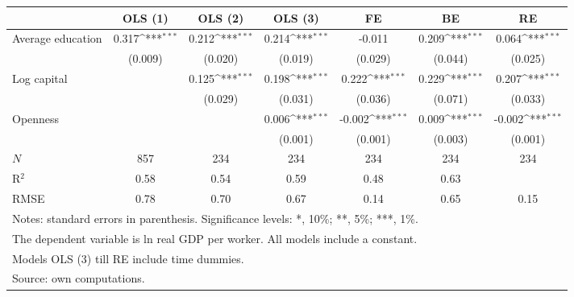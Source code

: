 {
\def\sym#1{\ifmmode^{#1}\else\(^{#1}\)\fi}
\begin{tabular}{l*{6}{c}}
\hline\hline
            &\multicolumn{1}{c}{OLS (1)}&\multicolumn{1}{c}{OLS (2)}&\multicolumn{1}{c}{OLS (3)}&\multicolumn{1}{c}{FE}&\multicolumn{1}{c}{BE}&\multicolumn{1}{c}{RE}\\
\hline
Average education&       0.317\sym{***}&       0.212\sym{***}&       0.214\sym{***}&      -0.011         &       0.209\sym{***}&       0.064\sym{***}\\
            &     (0.009)         &     (0.020)         &     (0.019)         &     (0.029)         &     (0.044)         &     (0.025)         \\
[1em]
Log capital &                     &       0.125\sym{***}&       0.198\sym{***}&       0.222\sym{***}&       0.229\sym{***}&       0.207\sym{***}\\
            &                     &     (0.029)         &     (0.031)         &     (0.036)         &     (0.071)         &     (0.033)         \\
[1em]
Openness    &                     &                     &       0.006\sym{***}&      -0.002\sym{***}&       0.009\sym{***}&      -0.002\sym{***}\\
            &                     &                     &     (0.001)         &     (0.001)         &     (0.003)         &     (0.001)         \\
\hline
\(N\)       &         857         &         234         &         234         &         234         &         234         &         234         \\
R$^2$       &        0.58         &        0.54         &        0.59         &        0.48         &        0.63         &                     \\
RMSE        &        0.78         &        0.70         &        0.67         &        0.14         &        0.65         &        0.15         \\
\hline\hline
\multicolumn{7}{l}{\footnotesize Notes: standard errors in parenthesis. Significance levels: *, 10\%; **, 5\%; ***, 1\%.}\\
\multicolumn{7}{l}{\footnotesize The dependent variable is ln real GDP per worker. All models include a constant.}\\
\multicolumn{7}{l}{\footnotesize Models OLS (3) till RE include time dummies.}\\
\multicolumn{7}{l}{\footnotesize Source: own computations.}\\
\end{tabular}
}
